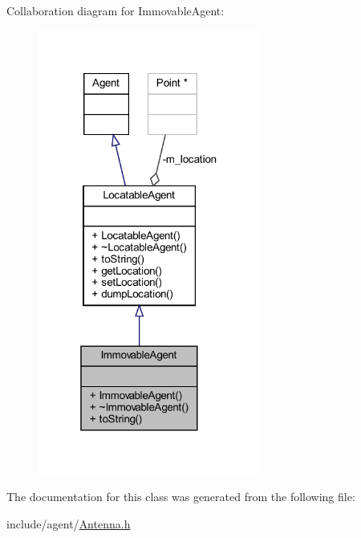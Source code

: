 Collaboration diagram for Immovable\+Agent\+:\nopagebreak
\begin{figure}[H]
\begin{center}
\leavevmode
\includegraphics[width=208pt]{class_immovable_agent__coll__graph}
\end{center}
\end{figure}


The documentation for this class was generated from the following file\+:\begin{DoxyCompactItemize}
\item 
include/agent/\hyperlink{_antenna_8h}{Antenna.\+h}\end{DoxyCompactItemize}
